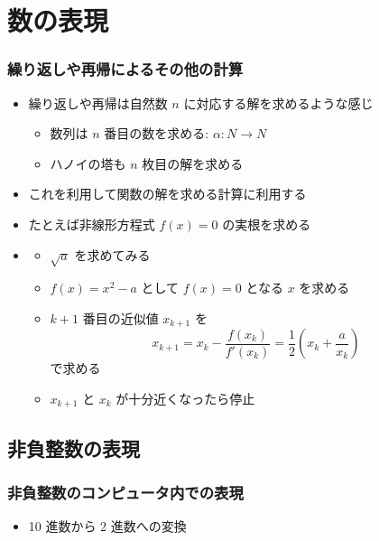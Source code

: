 \section{数の表現}
\begin{frame}[shrink]
\frametitle{繰り返しや再帰によるその他の計算}
  \begin{itemize}
\item 繰り返しや再帰は自然数 $n$ に対応する解を求めるような感じ
    \begin{itemize}
\item 数列は $n$ 番目の数を求める: \(\alpha\colon N\rightarrow N\)
\item ハノイの塔も $n$ 枚目の解を求める
    \end{itemize}
\item これを利用して関数の解を求める計算に利用する
\item たとえば非線形方程式 \(f(x)=0\) の実根を求める
\item \href{run:newton.command}{}
    \begin{itemize}
\item \(\sqrt{a}\) を求めてみる
\item \(f(x)=x^2-a\) として \(f(x)=0\) となる $x$ を求める
\item \(k+1\) 番目の近似値 \(x_{k+1}\) を
      \begin{displaymath}
x_{k+1} = x_k-\frac{f(x_k)}{f'(x_k)} = \frac{1}{2}(x_k+\frac{a}{x_k})
      \end{displaymath}
で求める
\item \(x_{k+1}\) と \(x_k\) が十分近くなったら停止
    \end{itemize}
  \end{itemize}
\end{frame}
\subsection{非負整数の表現}
\begin{frame}[label=Top_Integer]
\frametitle{非負整数のコンピュータ内での表現}
  \begin{itemize}
\item 10 進数から 2 進数への変換
  \end{itemize}
  \begin{center}
   \begin{example}[10進$\Leftrightarrow$2進]
   \begin{columns}[t]
    \begin{column}{3cm}
    \end{column}
    \begin{column}{3cm}
    \end{column}
   \end{columns}
   \end{example}
  \end{center}
\end{frame}
